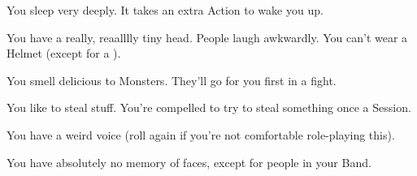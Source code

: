 \begin{multicols*}{2}

You sleep very deeply.  It takes an extra Action to wake you up.


You have a really, reaalllly tiny head.  People laugh awkwardly.  You can't wear a Helmet (except for a ).


You smell delicious to Monsters.  They'll go for you first in a fight.


You like to steal stuff.  You're compelled to try to steal something once a Session.


You have a weird voice (roll again if you're not comfortable role-playing this).


You have absolutely no memory of faces, except for people in your Band.


 \end{multicols*}
